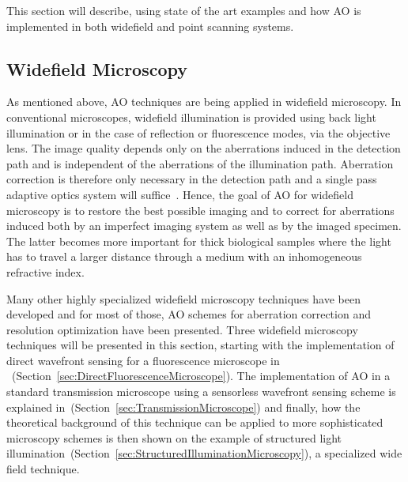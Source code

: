 This section will describe, using state of the art examples and how AO is implemented in both widefield and point scanning systems.  


\subsection{Widefield Microscopy}
\label{sec:WidefieldMicroscopy}

As mentioned above, AO techniques are being applied in widefield microscopy. In conventional microscopes, widefield illumination is provided using back light illumination or in the case of reflection or fluorescence modes, via the objective lens. The image quality depends only on the aberrations induced in the detection path and is independent of the aberrations of the illumination path. Aberration correction is therefore only necessary in the detection path and a single pass adaptive optics system will suffice~\cite{book_aberrations}. Hence, the goal of AO for widefield microscopy is to restore the best possible imaging and to correct for aberrations induced both by an imperfect imaging system as well as by the imaged specimen. The latter becomes more important for thick biological samples where the light has to travel a larger distance through a medium with an inhomogeneous refractive index. 

Many other highly specialized widefield microscopy techniques have been developed and for most of those, AO schemes for aberration correction and resolution optimization have been presented. Three widefield microscopy techniques will be presented in this section, starting with the implementation of direct wavefront sensing for a fluorescence microscope in ~(Section~\ref{sec:DirectFluorescenceMicroscope}). The implementation of AO in a standard transmission microscope using a sensorless wavefront sensing scheme is explained in~(Section~\ref{sec:TransmissionMicroscope}) and finally, how the theoretical background of this technique can be applied to more sophisticated microscopy schemes is then shown on the example of structured light illumination~(Section~\ref{sec:StructuredIlluminationMicroscopy}), a specialized wide field technique. 


